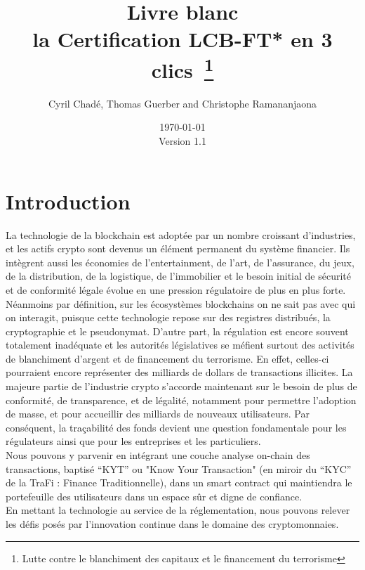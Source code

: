 ﻿\documentclass[a4paper]{article}
\newcommand{\version}{\vspace{10pt}\\ Version 1.1}
\begin{document}
\title{Livre blanc \vspace{10pt} \\
\large la Certification LCB-FT* en 3 clics~\footnote{Lutte contre le blanchiment des capitaux et le financement du terrorisme}}
\author{Cyril Chad\'e, Thomas Guerber and Christophe Ramananjaona}
\date{\today\version}
\maketitle
\thispagestyle{fancy}
\tableofcontents
\newpage
\section{Introduction}

La technologie de la blockchain est adoptée par un nombre croissant d’industries, et les actifs crypto sont devenus un élément permanent du système financier. Ils intègrent aussi les économies de l’entertainment, de l’art, de l’assurance, du jeux, de la distribution, de la logistique, de l’immobilier et le besoin initial de sécurité et de conformité légale évolue en une pression régulatoire de plus en plus forte. 
Néanmoins par définition, sur les écosystèmes blockchains on ne sait pas avec qui on interagit, puisque cette technologie repose sur des registres distribués, la cryptographie et le pseudonymat. D’autre part, la régulation est encore souvent totalement inadéquate et les autorités législatives se méfient surtout des activités de blanchiment d’argent et de financement du terrorisme. En effet, celles-ci pourraient encore représenter des milliards de dollars de transactions illicites.
La majeure partie de l’industrie crypto s’accorde maintenant sur le besoin de plus de conformité, de transparence, et de légalité, notamment pour permettre l’adoption de masse, et pour accueillir des milliards de nouveaux utilisateurs. Par conséquent, la traçabilité des fonds devient une question fondamentale pour les régulateurs ainsi que pour les entreprises et les particuliers. \\

Nous pouvons y parvenir en intégrant une couche analyse on-chain des transactions, baptisé “KYT” ou "Know Your Transaction" (en miroir du “KYC” de la TraFi : Finance Traditionnelle), dans un smart contract qui maintiendra le portefeuille des utilisateurs dans un espace sûr et digne de confiance. \\

En mettant la technologie au service de la réglementation, nous pouvons relever les défis posés par l'innovation continue dans le domaine des cryptomonnaies. \\
\end{document}
